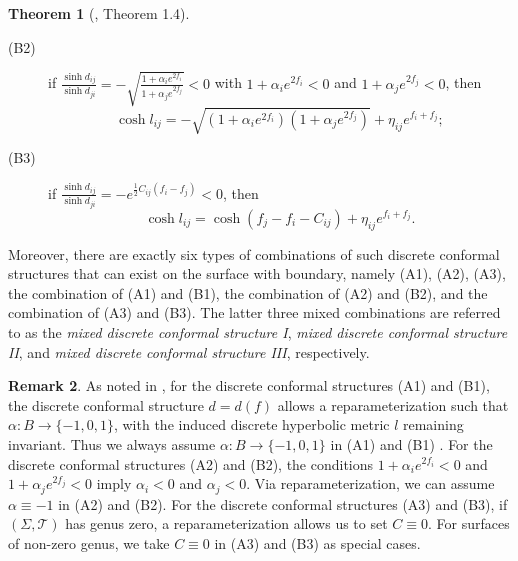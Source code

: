 \documentclass[12pt]{amsart}
\theoremstyle{definition}
\newtheorem{theorem}{Theorem}[section]
\newtheorem{remark}[theorem]{Remark}
\begin{document}
\begin{theorem}[\cite{X-Z DCS1}, Theorem 1.4]
\begin{description}
\item[(B2)]
if $\frac{\sinh d_{ij}}{\sinh d_{ji}}
=-\sqrt{\frac{1+\alpha_ie^{2f_i}}{1+\alpha_je^{2f_j}}}<0$
with $1+\alpha_ie^{2f_i}<0$ and $1+\alpha_je^{2f_j}<0$,
then
\begin{equation}\label{Eq: new 2}
\cosh l_{ij}
=-\sqrt{(1+\alpha_ie^{2f_i})(1+\alpha_je^{2f_j})}
+\eta_{ij}e^{f_i+f_j};
\end{equation}

\item[(B3)]
if $\frac{\sinh d_{ij}}{\sinh d_{ji}}
=-e^{\frac{1}{2}C_{ij}(f_i-f_j)}<0$,
then
\begin{equation}\label{Eq: DCS2}
\cosh l_{ij}
=\cosh(f_j-f_i-C_{ij})+\eta_{ij}e^{f_i+f_j}.
\end{equation}
\end{description}
Moreover, there are exactly six types of combinations of such discrete conformal structures that can exist on the surface with boundary, namely (A1), (A2), (A3), the combination of (A1) and (B1), the combination of (A2) and (B2), and the combination of (A3) and (B3). 
The latter three mixed combinations are referred to as the \emph{mixed discrete conformal structure I}, \emph{mixed discrete conformal structure II}, and \emph{mixed discrete conformal structure III}, respectively.
\end{theorem}

\begin{remark}\label{Rmk: 1}
As noted in \cite[Remark 1.5]{X-Z DCS1}, for the discrete conformal structures (A1) and (B1), the discrete conformal structure $d = d(f)$ allows a reparameterization such that $\alpha: B \to \{-1, 0, 1\}$, with the induced discrete hyperbolic metric $l$ remaining invariant. 
Thus we always assume $\alpha: B \to \{-1, 0, 1\}$ in (A1) and (B1) .
For the discrete conformal structures (A2) and (B2), the conditions $1 + \alpha_i e^{2f_i} < 0$ and $1 + \alpha_j e^{2f_j} < 0$ imply $\alpha_i < 0$ and $\alpha_j < 0$. 
Via reparameterization, we can assume $\alpha \equiv -1$ in (A2) and (B2).
For the discrete conformal structures (A3) and (B3), if $(\Sigma, \mathcal{T})$ has genus zero, a reparameterization allows us to set $C \equiv 0$.
For surfaces of non-zero genus, we take $C \equiv 0$ in (A3) and (B3) as special cases.
\end{remark}
\end{document}
